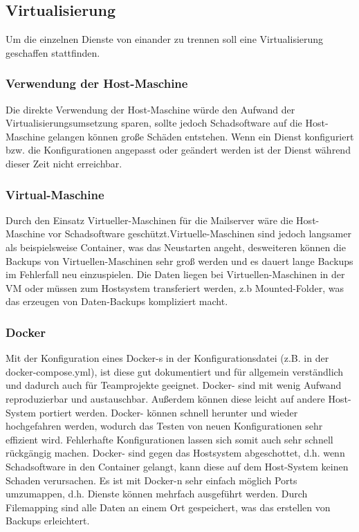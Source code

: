 \documentclass[a4paper,11pt,singlespacing]{article}
\begin{document}
		

	\subsection{Virtualisierung}\label{sec:Virtualisierung}
		Um die einzelnen Dienste von einander zu trennen soll eine Virtualisierung geschaffen stattfinden.

		\subsubsection{Verwendung der Host-Maschine}\label{Verwendung der Host-Maschine}
			Die direkte Verwendung der Host-Maschine würde den Aufwand der Virtualisierungsumsetzung sparen, sollte jedoch Schadsoftware auf die Host-Maschine gelangen können gro{\ss}e Schäden entstehen. Wenn ein Dienst konfiguriert bzw. die Konfigurationen angepasst oder geändert werden ist der Dienst während dieser Zeit nicht erreichbar.

		\subsubsection{Virtual-Maschine}\label{Virtual-Maschine}
			Durch den Einsatz Virtueller-Maschinen für die Mailserver wäre die Host-Maschine vor Schadsoftware geschützt.Virtuelle-Maschinen sind jedoch langsamer als beispielsweise Container, was das Neustarten angeht, desweiteren können die Backups von Virtuellen-Maschinen sehr gro{\ss} werden und es dauert lange Backups im Fehlerfall neu einzuspielen. Die Daten liegen bei Virtuellen-Maschinen in der VM oder müssen zum Hostsystem transferiert werden, z.b Mounted-Folder, was das erzeugen von Daten-Backups kompliziert macht.

		\subsubsection{Docker}\label{Docker}
			Mit der Konfiguration eines Docker-s in der Konfigurationsdatei (z.B. in der docker-compose.yml), ist diese gut dokumentiert und für allgemein verständlich und dadurch auch für Teamprojekte geeignet.
Docker- sind mit wenig Aufwand reproduzierbar und austauschbar. Au{\ss}erdem können diese leicht auf andere Host-System portiert werden. Docker- können schnell herunter und wieder hochgefahren werden, wodurch das Testen von neuen Konfigurationen sehr effizient wird. Fehlerhafte Konfigurationen lassen sich somit auch sehr schnell rückgängig machen. Docker- sind gegen das Hostsystem abgeschottet, d.h. wenn Schadsoftware in den Container gelangt, kann diese auf dem Host-System keinen Schaden verursachen. Es ist mit Docker-n sehr einfach möglich Ports umzumappen, d.h. Dienste können mehrfach ausgeführt werden. Durch Filemapping sind alle Daten an einem Ort gespeichert, was das erstellen von Backups erleichtert.
\end{document}
